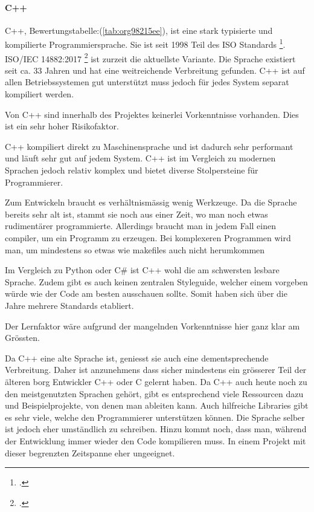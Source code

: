 \newpage
\paragraph{C++}
\label{sec:orga42458f}

C++, Bewertungstabelle:(\ref{tab:org98215ee}), ist eine stark typisierte und kompilierte Programmiersprache. Sie ist seit
1998 Teil des ISO Standards \footcite{cpp98}. ISO/IEC 14882:2017 \footcite{cpp17}
ist zurzeit die aktuellste Variante. Die Sprache existiert seit ca. 33 Jahren
und hat eine weitreichende Verbreitung gefunden. C++ ist auf allen
Betriebssystemen gut unterstützt muss jedoch für jedes System separat
kompiliert werden.

Von C++ sind innerhalb des Projektes keinerlei Vorkenntnisse vorhanden. Dies
ist ein sehr hoher Risikofaktor.

C++ kompiliert direkt zu Maschinensprache und ist dadurch sehr performant und
läuft sehr gut auf jedem System. C++ ist im Vergleich zu modernen Sprachen
jedoch relativ komplex und bietet diverse Stolpersteine für Programmierer.

Zum Entwickeln braucht es verhältnismässig wenig Werkzeuge. Da die Sprache
bereits sehr alt ist, stammt sie noch aus einer Zeit, wo man noch etwas
rudimentärer programmierte. Allerdings braucht man in jedem Fall einen
\gls{compiler}, um ein Programm zu erzeugen. Bei komplexeren Programmen wird man,
um mindestens so etwas wie \glspl{makefile} auch nicht herumkommen

Im Vergleich zu Python oder C\# ist C++ wohl die am schwersten lesbare Sprache.
Zudem gibt es auch keinen zentralen Styleguide, welcher einem vorgeben würde wie
der Code am besten ausschauen sollte. Somit haben sich über die Jahre mehrere
Standards etabliert.

Der Lernfaktor wäre aufgrund der mangelnden Vorkenntnisse hier ganz klar am
Grössten.

Da C++ eine alte Sprache ist, geniesst sie auch eine dementsprechende
Verbreitung. Daher ist anzunehmens dass sicher mindestens ein grösserer Teil der
älteren \gls{borg} Entwickler C++ oder C gelernt haben.
\newpage
Da C++ auch heute noch zu den meistgenutzten Sprachen gehört, gibt es
entsprechend viele Ressourcen dazu und Beispielprojekte, von denen man ableiten
kann. Auch hilfreiche Libraries gibt es sehr viele, welche den Programmierer
unterstützen können. Die Sprache selber ist jedoch eher umständlich zu
schreiben. Hinzu kommt noch, dass man, während der Entwicklung immer wieder den
Code kompilieren muss. In einem Projekt mit dieser begrenzten Zeitspanne eher
ungeeignet.

